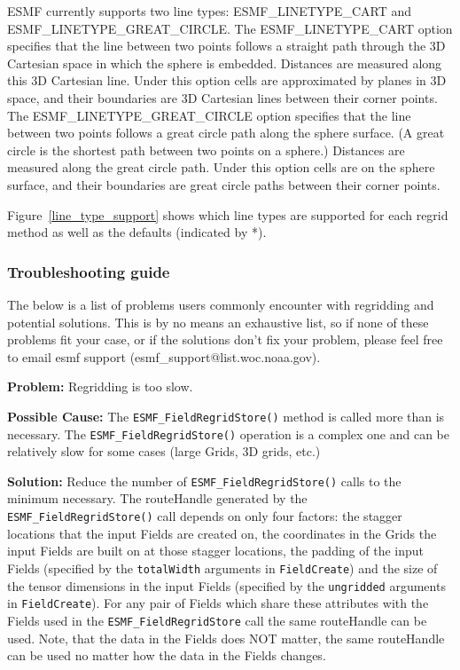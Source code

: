 ESMF currently supports two line types: ESMF\_LINETYPE\_CART and ESMF\_LINETYPE\_GREAT\_CIRCLE. The ESMF\_LINETYPE\_CART option 
specifies that the line between two points follows a straight path through the 3D Cartesian space in which the sphere is embedded.
Distances are measured along 
this 3D Cartesian line. Under this option cells are approximated by planes in 3D space, and their boundaries are 3D Cartesian lines
between their corner points.  The ESMF\_LINETYPE\_GREAT\_CIRCLE option specifies that the line between two points follows
a great circle path along the sphere surface. (A great circle is the shortest path between two points on a sphere.) 
Distances are measured along the great circle path. Under this option cells are on the sphere surface, and their boundaries 
are great circle paths between their corner points. 

Figure~\ref{line_type_support} shows which line types are supported for each regrid method as well as the defaults (indicated by *). 

\subsubsection{Troubleshooting guide}

 The below is a list of problems users commonly encounter with regridding and potential solutions. 
 This is by no means an exhaustive list, so if none of these problems fit your case, or if the solutions
 don't fix your problem, please feel free to email esmf support (esmf\_support@list.woc.noaa.gov).

 \bigskip
 
 {\bf Problem:} Regridding is too slow.

 \medskip

 {\bf Possible Cause:} The {\tt ESMF\_FieldRegridStore()} method is called more than is necessary. \newline
 The {\tt ESMF\_FieldRegridStore()} operation is a complex one and can be 
 relatively slow for some cases (large Grids, 3D grids, etc.) 
 
 \smallskip

 {\bf Solution:} Reduce the number of {\tt ESMF\_FieldRegridStore()} calls to the minimum necessary. The
 routeHandle generated by the {\tt ESMF\_FieldRegridStore()} call depends on only four factors: the 
 stagger locations that the input Fields are created on, the coordinates in the Grids the input Fields
 are built on at those stagger locations, the padding of the input Fields 
 (specified by the {\tt totalWidth} arguments in {\tt FieldCreate}) and the size of the tensor
 dimensions in the input Fields (specified by the {\tt ungridded} arguments in {\tt FieldCreate}). 
 For any pair of Fields which share these attributes with the Fields used in the
 {\tt ESMF\_FieldRegridStore} call  the same routeHandle can be used. Note, that the data in the 
 Fields does NOT matter, the same routeHandle can be used no matter how the data in the Fields changes.

